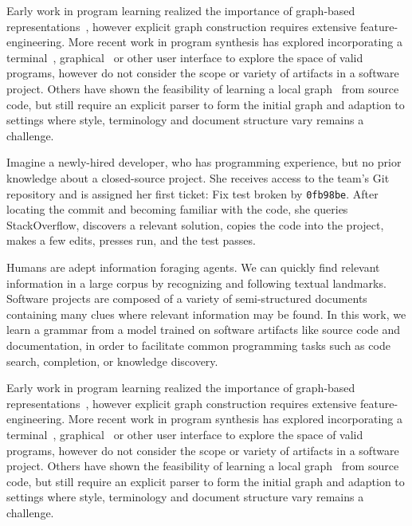 \documentclass[10pt]{article}
\begin{document}
  Early work in program learning realized the importance of graph-based representations~\cite{allamanis2017learning}, however explicit graph construction requires extensive feature-engineering. More recent work in program synthesis has explored incorporating a terminal~\cite{ellis2019write}, graphical~\cite{walke2020learning} or other user interface to explore the space of valid programs, however do not consider the scope or variety of artifacts in a software project. Others have shown the feasibility of learning a local graph~\cite{johnson2020learning} from source code, but still require an explicit parser to form the initial graph and adaption to settings where style, terminology and document structure vary remains a challenge.

Imagine a newly-hired developer, who has programming experience, but no prior knowledge about a closed-source project. She receives access to the team's Git repository and is assigned her first ticket: Fix test broken by \texttt{0fb98be}. After locating the commit and becoming familiar with the code, she queries StackOverflow, discovers a relevant solution, copies the code into the project, makes a few edits, presses run, and the test passes.

Humans are adept information foraging agents. We can quickly find relevant information in a large corpus by recognizing and following textual landmarks. Software projects are composed of a variety of semi-structured documents containing many clues where relevant information may be found. In this work, we learn a grammar from a model trained on software artifacts like source code and documentation, in order to facilitate common programming tasks such as code search, completion, or knowledge discovery.

Early work in program learning realized the importance of graph-based representations~\cite{allamanis2017learning}, however explicit graph construction requires extensive feature-engineering. More recent work in program synthesis has explored incorporating a terminal~\cite{ellis2019write}, graphical~\cite{walke2020learning} or other user interface to explore the space of valid programs, however do not consider the scope or variety of artifacts in a software project. Others have shown the feasibility of learning a local graph~\cite{johnson2020learning} from source code, but still require an explicit parser to form the initial graph and adaption to settings where style, terminology and document structure vary remains a challenge.
\end{document}

